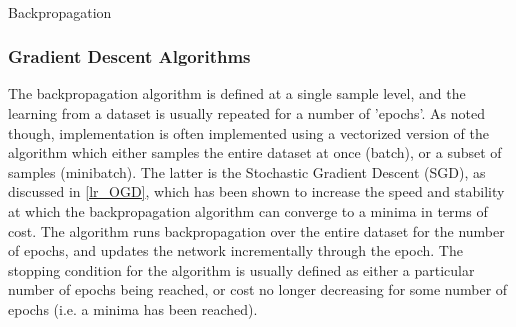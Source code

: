 \documentclass[a4paper,11pt,oneside]{article}
\theoremstyle{plain}
\theoremstyle{definition}
\begin{document}
\begin{algorithm}[H]
	
	\texttt{\\}


	\label{algo_backprop}
	\caption{Backpropagation}
\end{algorithm}




\subsubsection{Gradient Descent Algorithms}\label{imp_sgd}

The backpropagation algorithm is defined at a single sample level, and the learning from a dataset is usually repeated for a number of 'epochs'. As noted though, implementation is often implemented using a vectorized version of the algorithm which either samples the entire dataset at once (batch), or a subset of samples (minibatch). The latter is the Stochastic Gradient Descent (SGD), as discussed in \ref{lr_OGD}, which has been shown to increase the speed and stability at which the backpropagation algorithm can converge to a minima in terms of cost. The algorithm runs backpropagation over the entire dataset for the number of epochs, and updates the network incrementally through the epoch. The stopping condition for the algorithm is usually defined as either a particular number of epochs being reached, or cost no longer decreasing for some number of epochs (i.e. a minima has been reached).\newline
\end{document}
